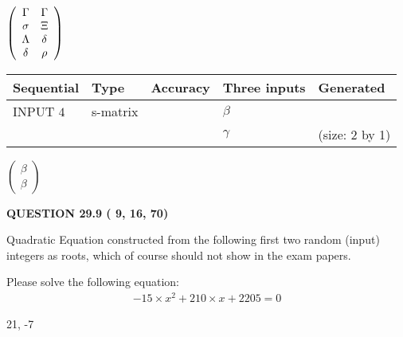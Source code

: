 \documentclass[12pt]{article}
\begin{document}
   
 $  \left( \begin{array}
 {
 c
 c
 }
 \Gamma & 
 \Gamma \\ 
 \sigma & 
                    \Xi \\ 
 \Lambda & 
 \delta \\ 
 \delta & 
 \rho
 \end{array} \right) $ 
  
  
\noindent\begin{tabular}{|l|l|l|l|l|}
\hline
 Sequential & Type & Accuracy & Three inputs & Generated \\ 
\hline
 
 
  INPUT $           4$ & s-matrix & & 
 $  \beta $ & 
  \\
  & & & 
 $  \gamma $ & 
  (size:           2 by           1)
 \\  \hline  
 \end{tabular}
   
   
 $  \left( \begin{array}
 {
 c
 }
 \beta \\ 
 \beta
 \end{array} \right) $ 
  
\vspace{0.2in}
  
{\textbf{\Large{QUESTION
29.9 
 (          9,         16,         70)
}}}
  
  


\noindent{}
Quadratic Equation constructed from the following first two random (input) integers as roots,  
which of course should not show in the exam papers.  
\noindent{}


 
 

 
Please solve the following equation:
\begin{eqnarray*}
-15 \times x^2  %
+  %
210
                 \times x    %
+  %
2205 =0
\end{eqnarray*}
 
 
 
\noindent{}
 
 

21,  %
-7
 
 
 
\noindent{}
 
\end{document}
